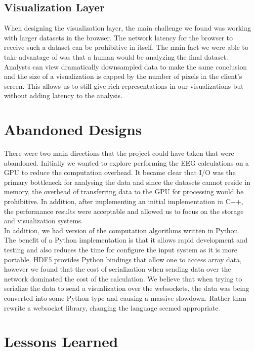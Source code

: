 \subsection{Visualization Layer}

When designing the visualization layer, the main challenge we found was working
with larger datasets in the browser. The network latency for the browser to
receive such a dataset can be prohibitive in itself. The main fact we were able
to take advantage of was that a human would be analyzing the final dataset.
Analysts can view dramatically downsampled data to make the same conclusion and
the size of a visualization is capped by the number of pixels in the client's
screen. This allows us to still give rich representations in our visualizations
but without adding latency to the analysis.

\section{Abandoned Designs}\label{discuss_ch:abandon}

There were two main directions that the project could have taken that were
abandoned. Initially we wanted to explore performing the EEG calculations on a
GPU to reduce the computation overhead. It became clear that I/O was the
primary bottleneck for analysing the data and since the datasets cannot reside
in memory, the overhead of transferring data to the GPU for processing would be
prohibitive. In addition, after implementing an initial implementation in C++,
the performance results were acceptable and allowed us to focus on the storage
and visualization systems. \\

In addition, we had version of the computation algorithms written in Python.
The benefit of a Python implementation is that it allows rapid development and
testing and also reduces the time for configure the input system as it is more
portable. HDF5 provides Python bindings that allow one to access array data,
however we found that the cost of serialization when sending data over the
network dominated the cost of the calculation. We believe that when trying to
serialize the data to send a visualization over the websockets, the data was
being converted into some Python type and causing a massive slowdown. Rather
than rewrite a websocket library, changing the language seemed appropriate.

\section{Lessons Learned}

